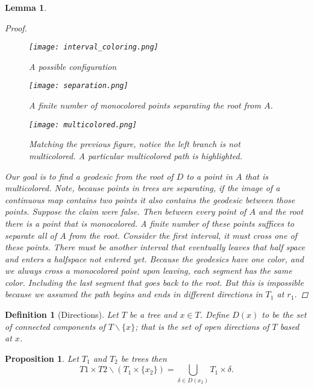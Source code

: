 \documentclass{article}
\theoremstyle{mystyle}
\newtheorem{lem}[thm]{Lemma}
\newtheorem{pro}[thm]{Proposition}
\newtheorem{defn}[thm]{Definition}
\theoremstyle{remark}
\begin{document}
\begin{lem}
\begin{proof}
\begin{figure}[!h]
    \centering
    \texttt{[image: interval\_coloring.png]}
    \caption{A possible configuration}
    \label{fig:square}
\end{figure}
\begin{figure}[!h]
    \centering
    \texttt{[image: separation.png]}
    \caption{A finite number of monocolored points separating the root from $A$.}
    \label{fig:square}
\end{figure}
\begin{figure}[!h]
    \centering
    \texttt{[image: multicolored.png]}
    \caption{Matching the previous figure, notice the left branch is not multicolored. A particular multicolored path is highlighted.}
    \label{fig:square}
\end{figure}


        Our goal is to find a geodesic from the root of \(D\) to a point in \(A\) that is multicolored. Note, because points in trees are separating, if the image of a continuous map contains two points it also contains the geodesic between those points. Suppose the claim were false. Then between every point of \(A\) and the root there is a point that is monocolored. A finite number of these points suffices to separate all of \(A\) from the root. Consider the first interval, it must cross one of these points. There must be another interval that eventually leaves that half space and enters a halfspace not entered yet. Because the geodesics have one color, and we always cross a monocolored point upon leaving, each segment has the same color. Including the last segment that goes back to the root. But this is impossible because we assumed the path begins and ends in different directions in \(T_{1}\) at \(r_{1}\).

    \end{proof}
\end{lem}

\begin{defn}
[Directions]
Let $T$ be a tree and $x\in T$. Define $D(x)$ to be the set of connected components of $T\smallsetminus\{x\}$; that is the set of open directions of $T$ based at $x$.
\end{defn}

\begin{pro}
\label{prop:sliceunion}
Let $T_1$ and $T_2$ be trees then $$T1\times T2 \smallsetminus (T_1\times \{x_2\}) = \bigcup_{\delta \in D(x_2)} T_1\times \delta.$$
\end{pro}
\end{document}
